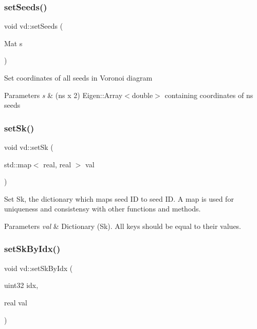 \subsubsection{\texorpdfstring{set\+Seeds()}{setSeeds()}}
{\footnotesize\ttfamily void vd\+::set\+Seeds (\begin{DoxyParamCaption}\item[{Mat}]{s }\end{DoxyParamCaption})}

Set coordinates of all seeds in Voronoi diagram 
\begin{DoxyParams}{Parameters}
{\em s} & (ns x 2) Eigen\+::\+Array$<$double$>$ containing coordinates of ns seeds \\
\hline
\end{DoxyParams}
\mbox{\label{classvd_a42dc1ab4c7033c49c0b3716d461ad2ef}} 
\subsubsection{\texorpdfstring{set\+Sk()}{setSk()}}
{\footnotesize\ttfamily void vd\+::set\+Sk (\begin{DoxyParamCaption}\item[{std\+::map$<$ real, real $>$}]{val }\end{DoxyParamCaption})}

Set Sk, the dictionary which maps seed ID to seed ID. A map is used for uniqueness and consistensy with other functions and methods. 
\begin{DoxyParams}{Parameters}
{\em val} & Dictionary (Sk). All keys should be equal to their values. \\
\hline
\end{DoxyParams}
\mbox{\label{classvd_a578ca6980896563397214c584401c7f5}} 
\subsubsection{\texorpdfstring{set\+Sk\+By\+Idx()}{setSkByIdx()}}
{\footnotesize\ttfamily void vd\+::set\+Sk\+By\+Idx (\begin{DoxyParamCaption}\item[{uint32}]{idx,  }\item[{real}]{val }\end{DoxyParamCaption})}

